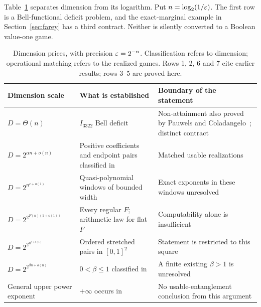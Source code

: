 Table~\ref{tab:scales} separates dimension from its logarithm. Put $n=\log_2(1/\varepsilon)$. The first row is a Bell-functional deficit problem, and the exact-marginal example in Section~\ref{sec:farey} has a third contract. Neither is silently converted to a Boolean value-one game.
\begin{table}[ht]
\centering\small
\begin{tabular}{@{}>{\raggedright\arraybackslash}p{.24\linewidth}>{\raggedright\arraybackslash}p{.31\linewidth}>{\raggedright\arraybackslash}p{.37\linewidth}@{}}
\toprule
Dimension scale & What is established & Boundary of the statement\\
\midrule
$D=\Theta(n)$ & $I_{3322}$ Bell deficit~\cite{Irate} & Non-attainment also proved by Pauwels and Coladangelo~\cite{Pauwels,ColI}; distinct contract\\
$D=2^{\alpha n+o(n)}$ & Positive coefficients and endpoint pairs classified in~\cite[Theorem Q4.2]{UP} & Matched usable realizations\\
$D=2^{n^{c+o(1)}}$ & Quasi-polynomial windows of bounded width & Exact exponents in these windows unresolved\\
$D=2^{2^{F(n)(1+o(1))}}$ & Every regular $F$; arithmetic law for flat $F$ & Computability alone is insufficient\\
$D=2^{2^{n^{c+o(1)}}}$ & Ordered stretched pairs in $[0,1]^2$ & Statement is restricted to this square\\
$D=2^{2^{\beta n+o(n)}}$ & $0<\beta\le1$ classified in~\cite[Theorems P1.1, Q6.1]{UP} & A finite existing $\beta>1$ is unresolved\\
General upper power exponent & $+\infty$ occurs in~\cite[Theorem P6.11]{UP} & No usable-entanglement conclusion from this argument\\
\bottomrule
\end{tabular}
\caption{Dimension prices, with precision $\varepsilon=2^{-n}$. Classification refers to dimension; operational matching refers to the realized games. Rows 1, 2, 6 and 7 cite earlier results; rows 3--5 are proved here.}\label{tab:scales}
\end{table}

